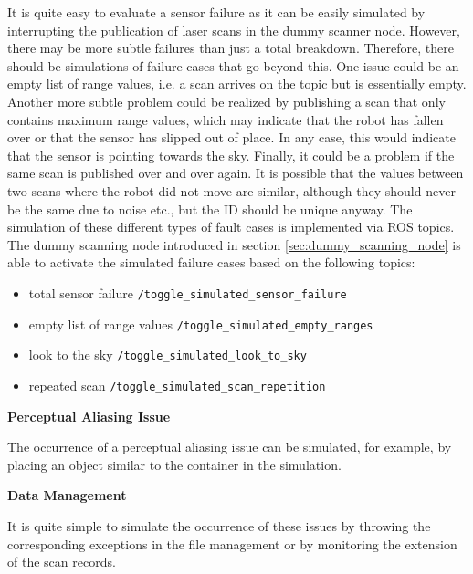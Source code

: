 \documentclass[english, master, utf8]{base/thesis_KBS}
\newcommand{\code}[1]{\colorbox{light-gray}{\texttt{#1}}}
\begin{document}
\noindent
It is quite easy to evaluate a sensor failure as it can be easily simulated by interrupting the publication of laser scans in the dummy scanner node.
However, there may be more subtle failures than just a total breakdown. Therefore, there should be simulations of failure cases that go beyond this.
One issue could be an empty list of range values, i.e. a scan arrives on the topic but is essentially empty. Another more subtle problem could be realized by 
publishing a scan that only contains maximum range values, which may indicate that the robot has fallen over or that the sensor has slipped out of place. 
In any case, this would indicate that the sensor is pointing towards the sky. Finally, it could be a problem if the same scan is published over and over again.
It is possible that the values between two scans where the robot did not move are similar, although they should never be the same due to noise etc., but the ID 
should be unique anyway. The simulation of these different types of fault cases is implemented via ROS topics.
The dummy scanning node introduced in section \ref{sec:dummy_scanning_node} is able to activate the simulated failure cases based on the following topics:
\begin{itemize}
    \item total sensor failure \textrightarrow \code{/toggle\_simulated\_sensor\_failure}
    \item empty list of range values \textrightarrow \code{/toggle\_simulated\_empty\_ranges}
    \item look to the sky \textrightarrow \code{/toggle\_simulated\_look\_to\_sky}
    \item repeated scan \textrightarrow \code{/toggle\_simulated\_scan\_repetition}\newline
\end{itemize}

\noindent
\textbf{Perceptual Aliasing Issue}\newline

\noindent
The occurrence of a perceptual aliasing issue can be simulated, for example, by placing an object similar to the container in the simulation.\newline

\noindent
\textbf{Data Management}\newline

\noindent
It is quite simple to simulate the occurrence of these issues by throwing the corresponding exceptions in the file management or by monitoring the extension
of the scan records.\newline
\end{document}
